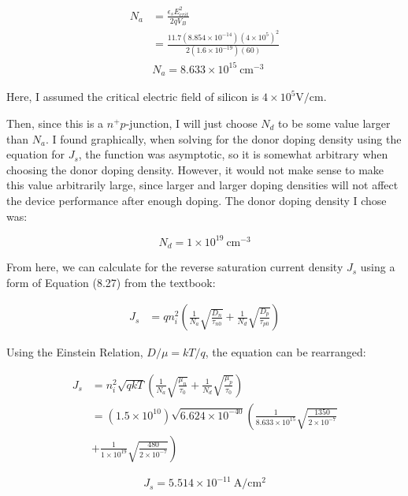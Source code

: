 \documentclass{IEEEtran}
\begin{document}
\begin{align*}
    N_a &= \frac{\epsilon_s E^2_{crit}}{2qV_B} \\
        &= \frac{11.7 (8.854 \times 10^{-14}) (4\times10^{5})^2}{2(1.6\times10^{-19})(60)} \\
        & \boxed{N_a = 8.633\times10^{15} ~ \text{cm}^{-3}}
\end{align*}

Here, I assumed the critical electric field of silicon is \(4\times10^5 \text{V}/\text{cm}\).  

Then, since this is a \(n^+p\)-junction, I will just choose \(N_d\) to be some value larger than \(N_a\). I found graphically, when solving for the donor doping density using the equation for \(J_s\), the function was asymptotic, so it is somewhat arbitrary when choosing the donor doping density. However, it would not make sense to make this value arbitrarily large, since larger and larger doping densities will not affect the device performance after enough doping. The donor doping density I chose was:

\begin{equation*}
    \boxed{N_d = 1 \times 10^{19} ~\text{cm}^{-3}}
\end{equation*}

From here, we can calculate for the reverse saturation current density \(J_s\) using a form of Equation (8.27) from the textbook:

\begin{align*}
    J_s &= qn_i^2 \left( \frac{1}{N_a} \sqrt{\frac{D_n}{\tau_{n0}}} +  \frac{1}{N_d} \sqrt{\frac{D_p}{\tau_{p0}}}\right)
\end{align*}

Using the Einstein Relation, \(D/\mu = kT/q\), the equation can be rearranged:

\begin{align*}
    J_s &= n_i^2 \sqrt{qkT}  \left( \frac{1}{N_a} \sqrt{\frac{\mu_n}{\tau_{0}}} +  \frac{1}{N_d} \sqrt{\frac{\mu_p}{\tau_{0}}}\right) \\
        &= (1.5 \times 10^{10}) \sqrt{6.624\times10^{-40}} \left( \frac{1}{8.633\times10^{15}} \sqrt{\frac{1350}{2\times10^{-7}}} \right.\\ 
        & \left. + \frac{1}{1\times10^{19}} \sqrt{\frac{480}{2\times10^{-7}}} \right)
\end{align*}

\begin{equation*}
    \boxed{J_s = 5.514\times10^{-11} ~ \text{A}/\text{cm}^2}
\end{equation*}
\end{document}
